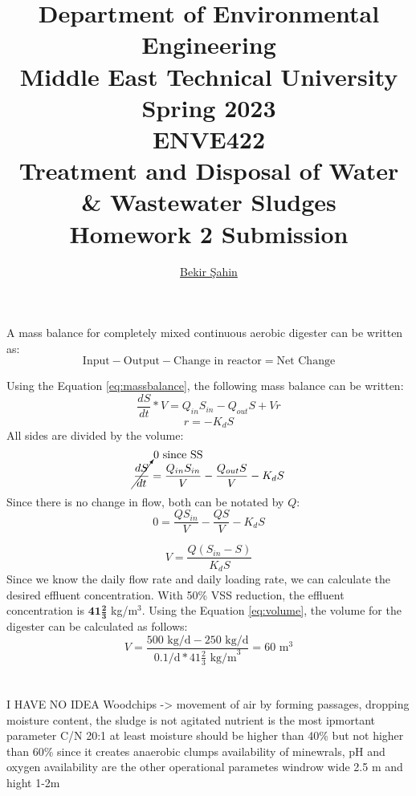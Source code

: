 \documentclass[a4paper]{article}
\title{Department of Environmental Engineering\\Middle East Technical University\\Spring 2023\\ENVE422\\Treatment and Disposal of Water \& Wastewater Sludges\\Homework 2 Submission} %
\author{\href{sahin.bekir@metu.edu.tr}{Bekir Şahin}} %
\begin{document}
\setcounter{page}{0}
\onehalfspacing
\maketitle %
\thispagestyle{empty}
\listoftodos
\newpage
{}
\section{}
A mass balance for completely mixed continuous aerobic digester \autocite{metcalf2014} can be written as:
\begin{equation}
    \text{Input} - \text{Output} - \text{Change in reactor} = \text{Net Change} \label{eq:massbalance}
\end{equation}
\begin{minipage}[c]{0.5\textwidth}
Using the Equation \ref{eq:massbalance}, the following mass balance can be written:
$$\frac{dS}{dt}*V = Q_{in} S_{in} - Q_{out} S + V r$$
$$r = -K_dS$$
All sides are divided by the volume:
$$\cancelto{\text{0 since SS}}{\frac{dS}{dt}} = \frac{Q_{in} S_{in}}{V} - \frac{Q_{out} S}{V} - K_dS$$
Since there is no change in flow, both can be notated by $Q$:
$$0 = \frac{Q S_{in}}{V} - \frac{Q S}{V} - K_d S$$
\end{minipage}
\hfill
\begin{minipage}{0.4\textwidth}
\end{minipage}
\begin{equation}
    V = \frac{Q (S_{in} -  S)}{K_d S } \label{eq:volume}
\end{equation}
Since we know the daily flow rate and daily loading rate, we can calculate the desired effluent concentration. With 50\% VSS reduction, the effluent concentration is $\mathbf{41\frac{2}{3}}$ kg/m$^3$. Using the Equation \ref{eq:volume}, the volume for the digester can be calculated as follows:
$$V=\frac{500\text{ kg/d}-250\text{ kg/d}}{0.1\text{/d}*41\frac{2}{3}\text{ kg/m}^3}=\boxed{60 \text{ m}^3}$$
\section{}
I HAVE NO IDEA \autocite{vesilind1988}
Woodchips -> movement of air by forming passages, dropping moisture content, 
the sludge is not agitated
nutrient is the most ipmortant parameter C/N 20:1 at least
moisture should be higher than 40\% but not higher than 60\% since it creates anaerobic clumps
availability of minewrals, pH and oxygen availability are the other operational parametes
windrow wide 2.5 m and hight 1-2m
\end{document}
